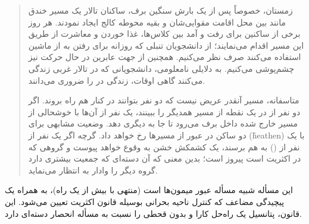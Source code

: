 \documentclass{book}
\begin{document}
\begin{quote}
    زمستان، خصوصاً پس از یک بارش سنگین برف، ساکنان تالار   یک مسیر خندق مانند بین محل اقامت مقوایی‌شان  و بقیه محوطه کالج 
    ایجاد نمودند. هر روز برخی از ساکنین  برای رفت و آمد بین کلاس‌ها، غذا خوردن و معاشرت از طریق این مسیر اقدام می‌نمایند؛ از دانشجویان 
    تنبلی که روزانه  برای رفتن به    از ماشین استفاده می‌کنند صرف نظر می‌کنیم. همچنین از جهت عابرین در حال حرکت نیز چشم‌پوشی می‌کنیم. 
    به دلایلی نامعلومی، دانشجویانی که در تالار غربی زندگی می‌کنند گاهی اوقات، زندگی در  را ضروری می‌دانند. 
    

    متاسفانه، مسیر آنقدر عریض نیست که دو نفر بتوانند در کنار هم راه بروند. اگر دو نفر از  در یک نقطه از مسیر همدیگر را ببینند، 
    یک نفر از آن‌ها با خوشحالی از مسیر خارج شده داخل برف می‌رود تا جا به دیگری دهد. وضعیت مشابهی برای دو ساکن 
    در عبور از مسیر‌ها رخ خواهد داد. گرچه اگر یک نفر از  (\r{heathen}) 
    با یک نفر از   () به هم برسند، یک کشمکش خشن 
    به وقوع خواهد پیوست  و گروهی که در اکثریت است پیروز است؛ بدین معنی که آن دسته‌ای که جمعیت بیشتری دارد گروه دیگر را 
    وادار به انتظار می‌نماید. 
\end{quote}

    این مسأله شبیه مسأله عبور میمون‌ها است (منتهی با بیش از یک راه)، به همراه یک پیچیدگی مضاعف
     که کنترل ناحیه بحرانی بوسیله قانون اکثریت تعیین می‌شود. این قانون، پتانسیل یک راه‌حل کارا و بدون قحطی را نسبت به مسأله 
     انحصار دسته‌ای دارد. 
\end{document}
